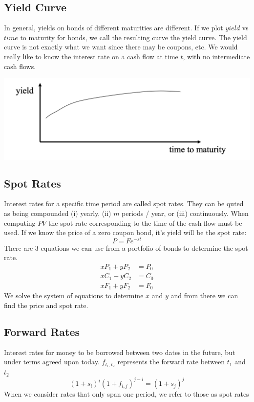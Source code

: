 \documentclass[11pt]{article}
\begin{document}
\subsection{Yield Curve}
In general, yields on bonds of different maturities are different.  If we plot $yield$ vs $time$ to maturity for bonds, we call the resulting curve the yield curve. The yield curve is not exactly what we want since there may be coupons, etc. We would really like to know the interest rate on a cash flow at time $t$, with no intermediate cash flows.
\begin{center}
\includegraphics[scale=0.6]{images/yieldcurve.png} 
\end{center}
\subsection{Spot Rates}
Interest rates for a specific time period are called spot rates. They can be quted as being compounded (i) yearly, (ii) $m$ periods / year, or (iii) continuously.  When computing $PV$ the spot rate corresponding to the time of the cash flow must be used. If we know the price of a zero coupon bond, it's yield will be the spot rate:
$$ P = Fe^{-st}$$
There are 3 equations we can use from a portfolio of bonds to determine the spot rate. 
\begin{align*}
xP_1 + yP_2 &= P_0 \\ 
xC_1 +yC_2 &= C_0 \\ 
xF_1 + yF_2 &= F_0 
\end{align*}
We solve the system of equations to determine $x$  and $y$ and from there we can find the price and spot rate.
\subsection{Forward Rates}
Interest rates for money to be borrowed between two dates in the future, but under terms agreed upon today. $f_{t_1, t_2}$ represents the forward rate between $t_1$ and $t_2$ 
$$ (1+ s_i)^i (1 +f_{i,j})^{j-i} = (1+s_j)^j$$
When we consider rates that only span one period, we refer to those as spot rates 
\end{document}
